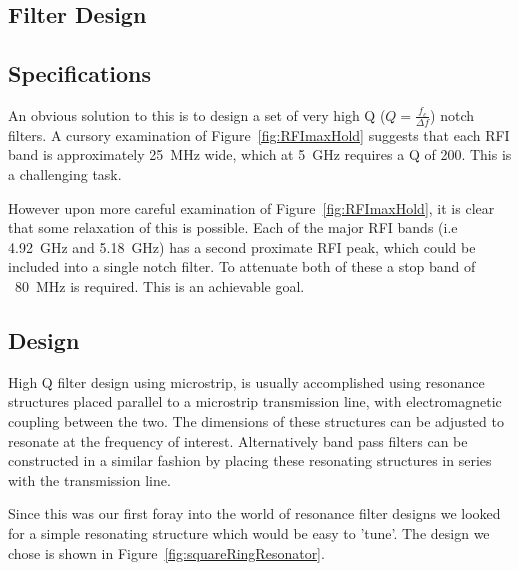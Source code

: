 \clearpage


\subsection{Filter Design}

\subsection{Specifications}
An obvious solution to this is to design a set of very high Q ($Q=\frac{f_{c}}{\Delta f}$) notch filters. A cursory examination of Figure~\ref{fig:RFImaxHold} suggests that each RFI band is approximately 25~MHz wide, which at 5~GHz requires a Q of 200. This is a challenging task.

However upon more careful examination of Figure~\ref{fig:RFImaxHold}, it is clear that some relaxation of this is possible. Each of the major RFI bands (i.e 4.92~GHz and 5.18~GHz) has a second proximate RFI peak, which could be included into a single notch filter. To attenuate both of these a stop band of ~80~MHz is required. This is an achievable goal.

\subsection{Design}

High Q filter design using microstrip, is usually accomplished using resonance structures placed parallel to a microstrip transmission line, with electromagnetic coupling between the two. The dimensions of these structures can be adjusted to resonate at the frequency of interest. Alternatively band pass filters can be constructed in a similar fashion by placing these resonating structures in series with the transmission line.

Since this was our first foray into the world of resonance filter designs we looked for a simple resonating structure which would be easy to 'tune'. The design we chose \cite{Garcia2005} is shown in Figure~\ref{fig:squareRingResonator}.

